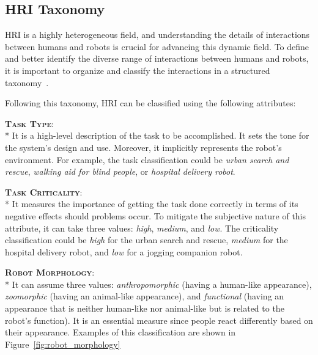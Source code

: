 \subsection{HRI Taxonomy}\label{subsec:hri_taxonomy}
HRI is a highly heterogeneous field, and understanding the details of interactions between humans and robots is crucial for advancing this dynamic field. 
To define and better identify the diverse range of interactions between humans and robots, 
it is important to organize and classify the interactions in a structured taxonomy~\cite{yanco2004taxonomy}.

Following this taxonomy, HRI can be classified using the following attributes:

{\bfseries \scshape Task Type}:\\*
It is a high-level description of the task to be accomplished. It sets the tone for the system's design and use. 
Moreover, it implicitly represents the robot's environment. 
For example, the task classification could be \textit{urban search and rescue}, \textit{walking aid for blind people}, or \textit{hospital delivery robot}.

{\bfseries \scshape Task Criticality}:\\*
It measures the importance of getting the task done correctly in terms of its negative effects should problems occur. 
To mitigate the subjective nature of this attribute, it can take three values: \textit{high}, \textit{medium}, and \textit{low}.
The criticality classification could be \textit{high} for the urban search and rescue, \textit{medium} for the hospital delivery robot, and \textit{low} for a jogging companion robot.

{\bfseries \scshape Robot Morphology}:\\*
It can assume three values: \textit{anthropomorphic} (having a human-like appearance), \textit{zoomorphic} (having an animal-like appearance), 
and \textit{functional} (having an appearance that is neither human-like nor animal-like but is related to the robot's function).
It is an essential measure since people react differently based on their appearance.
Examples of this classification are shown in Figure~\ref{fig:robot_morphology}

